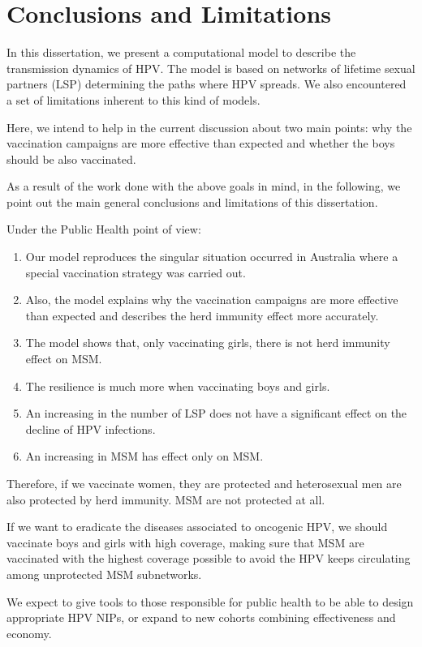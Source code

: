 \chapter{Conclusions and Limitations}\label{conclusion}
In this dissertation, we present a computational model to describe the transmission dynamics of HPV. The model is based on networks of lifetime sexual partners (LSP) determining the paths where HPV spreads. We also encountered a set of limitations inherent to this kind of models.

Here, we intend to help in the current discussion about two main points: why the vaccination campaigns are more effective than expected and whether the boys should be also vaccinated.

As a result of the work done with the above goals in mind, in the following, we point out the main general conclusions and limitations of this dissertation.

Under the Public Health point of view:
\begin{enumerate}
	\item Our model reproduces the singular situation occurred in Australia where a special vaccination strategy was carried out.
	\item Also, the model explains why the vaccination campaigns are more effective than expected and describes the herd immunity effect more accurately.
	\item The model shows that, only vaccinating girls, there is not herd immunity effect on MSM.
	\item The resilience is much more when vaccinating boys and girls. 
	\item An increasing in the number of LSP does not have a significant effect on the decline of HPV infections.
	\item An increasing in MSM has effect only on MSM.
\end{enumerate}

Therefore, if we vaccinate women, they are protected and heterosexual men are also protected by herd immunity. MSM are not protected at all.

If we want to eradicate the diseases associated to oncogenic HPV, we should vaccinate boys and girls with high coverage, making sure that MSM are vaccinated with the highest coverage possible to avoid the HPV keeps circulating among unprotected MSM subnetworks.

We expect to give tools to those responsible for public health to be able to design appropriate HPV NIPs, or expand to new cohorts combining effectiveness and economy.

